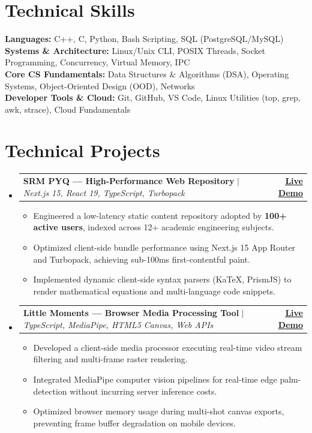 \documentclass[letterpaper,10pt]{article}
\makeatletter
\newcommand{\resumeItem}[1]{
  \item\small{
    {#1 \vspace{-2pt}}
  }
}
\newcommand{\resumeProjectHeading}[2]{
    \item
    \begin{tabular*}{1.0\textwidth}[t]{l@{\extracolsep{\fill}}r}
      \small#1 & \textbf{\small #2}\\
    \end{tabular*}\vspace{-4pt}
}
\newcommand{\resumeSubHeadingListStart}{\begin{itemize}[leftmargin=0.0in, label={}]}
\newcommand{\resumeSubHeadingListEnd}{\end{itemize}}
\newcommand{\resumeItemListStart}{\begin{itemize}[leftmargin=0.15in, label=\raisebox{0.15ex}{\tiny$\bullet$}, itemsep=1.5pt]}
\newcommand{\resumeItemListEnd}{\end{itemize}\vspace{-3pt}}
\makeatother
\begin{document}
\section{Technical Skills}
 \begin{itemize}[leftmargin=0.0in, label={}, itemsep=2pt]
    \small{\item{
     \textbf{Languages:}{ C++, C, Python, Bash Scripting, SQL (PostgreSQL/MySQL)} \\
     \textbf{Systems \& Architecture:}{ Linux/Unix CLI, POSIX Threads, Socket Programming, Concurrency, Virtual Memory, IPC} \\
     \textbf{Core CS Fundamentals:}{ Data Structures \& Algorithms (DSA), Operating Systems, Object-Oriented Design (OOD), Networks} \\
     \textbf{Developer Tools \& Cloud:}{ Git, GitHub, VS Code, Linux Utilities (top, grep, awk, strace), Cloud Fundamentals}
    }}
 \end{itemize}

\section{Technical Projects}
    \resumeSubHeadingListStart
      \resumeProjectHeading
          {\textbf{SRM PYQ --- High-Performance Web Repository} $|$ \emph{Next.js 15, React 19, TypeScript, Turbopack}}{\href{https://srm-pyq.vercel.app/}{\underline{Live Demo}}}
          \resumeItemListStart
            \resumeItem{Engineered a low-latency static content repository adopted by \textbf{100+ active users}, indexed across 12+ academic engineering subjects.}
            \resumeItem{Optimized client-side bundle performance using Next.js 15 App Router and Turbopack, achieving sub-100ms first-contentful paint.}
            \resumeItem{Implemented dynamic client-side syntax parsers (KaTeX, PrismJS) to render mathematical equations and multi-language code snippets.}
          \resumeItemListEnd

      \resumeProjectHeading
          {\textbf{Little Moments --- Browser Media Processing Tool} $|$ \emph{TypeScript, MediaPipe, HTML5 Canvas, Web APIs}}{\href{https://lilmom.vercel.app/}{\underline{Live Demo}}}
          \resumeItemListStart
            \resumeItem{Developed a client-side media processor executing real-time video stream filtering and multi-frame raster rendering.}
            \resumeItem{Integrated MediaPipe computer vision pipelines for real-time edge palm-detection without incurring server inference costs.}
            \resumeItem{Optimized browser memory usage during multi-shot canvas exports, preventing frame buffer degradation on mobile devices.}
          \resumeItemListEnd
    \resumeSubHeadingListEnd
\end{document}
